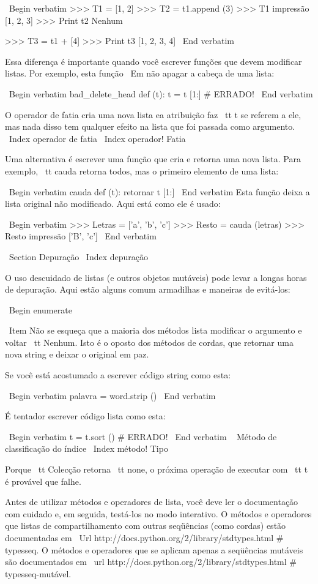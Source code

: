\documentclass[10pt]{book}
\begin{document}
\begin {itemize}
{{{{{{{\ Begin {verbatim}
>>> T1 = [1, 2]
>>> T2 = t1.append (3)
>>> T1 impressão
[1, 2, 3]
>>> Print t2
Nenhum

>>> T3 = t1 + [4]
>>> Print t3
[1, 2, 3, 4]
\ End {verbatim}

Essa diferença é importante quando você escrever funções que
devem modificar listas. Por exemplo, esta função
{\ Em não apagar} a cabeça de uma lista:

\ Begin {verbatim}
bad_delete_head def (t):
    t = t [1:] # ERRADO!
\ End {verbatim}

O operador de fatia cria uma nova lista ea atribuição
faz {\ tt t} se referem a ele, mas nada disso tem qualquer efeito
na lista que foi passada como argumento.
\ Index {operador de fatia}
\ Index {operador! Fatia}

Uma alternativa é escrever uma função que cria e
retorna uma nova lista. Para
exemplo, {\ tt cauda} retorna todos, mas o primeiro
elemento de uma lista:

\ Begin {verbatim}
cauda def (t):
    retornar t [1:]
\ End {verbatim}
%
Esta função deixa a lista original não modificado.
Aqui está como ele é usado:

\ Begin {verbatim}
>>> Letras = ['a', 'b', 'c']
>>> Resto = cauda (letras)
>>> Resto impressão
['B', 'c']
\ End {verbatim}



\ Section {} Depuração
\ Index {depuração}

O uso descuidado de listas (e outros objetos mutáveis)
pode levar a longas horas de depuração. Aqui estão alguns comum
armadilhas e maneiras de evitá-los:

\ Begin {enumerate}

\ Item Não se esqueça que a maioria dos métodos lista modificar o argumento e
  voltar {\ tt Nenhum}. Isto é o oposto dos métodos de cordas,
  que retornar uma nova string e deixar o original em paz.

Se você está acostumado a escrever código string como esta:

\ Begin {verbatim}
palavra = word.strip ()
\ End {verbatim}

É tentador escrever código lista como esta:

\ Begin {verbatim}
t = t.sort () # ERRADO!
\ End {verbatim}
\ {} Método de classificação do índice
\ Index {método! Tipo}

Porque {\ tt Colecção} retorna {\ tt none}, o
próxima operação de executar com {\ tt t} é provável que falhe.

Antes de utilizar métodos e operadores de lista, você deve ler o
documentação com cuidado e, em seguida, testá-los no modo interativo. O
métodos e operadores que listas de compartilhamento com outras seqüências (como
cordas) estão documentadas em
\ Url {http://docs.python.org/2/library/stdtypes.html # typesseq}. O
métodos e operadores que se aplicam apenas a seqüências mutáveis
são documentados em \ url {http://docs.python.org/2/library/stdtypes.html # typesseq-mutável}.


}}}}}}}
\end{itemize}
\end{document}
